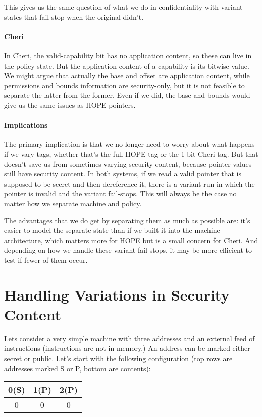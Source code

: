 \documentclass{article}
\begin{document}
This gives us the same question of what we do in confidentiality with variant states that
fail-stop when the original didn't.

\paragraph*{Cheri} In Cheri, the valid-capability bit has no application content, so these can
live in the policy state. But the application content of a capability is its bitwise value.
We might argue that actually the base and offset are application content, while permissions
and bounds information are security-only, but it is not feasible to separate the latter
from the former. Even if we did, the base and bounds would give us the same issues as HOPE
pointers.

\paragraph*{Implications} The primary implication is that we no longer need to worry about
what happens if we vary tags, whether that's the full HOPE tag or the 1-bit Cheri tag.
But that doesn't save us from sometimes varying security content, because pointer values
still have security content. In both systems, if we read a valid pointer that is supposed to
be secret and then dereference it, there is a variant run in which the pointer is invalid and
the variant fail-stops. This will always be the case no matter how we separate machine and
policy.

The advantages that we do get by separating them as much as possible are: it's easier to model
the separate state than if we built it into the machine architecture, which matters more for
HOPE but is a small concern for Cheri. And depending on how we handle these variant fail-stops,
it may be more efficient to test if fewer of them occur.

\section{Handling Variations in Security Content}

Lets consider a very simple machine with three addresses and an external feed of instructions
(instructions are not in memory.) An address can be marked either secret or public. Let's start with
the following configuration (top rows are addresses marked S or P, bottom are contents):

\begin{tabular}{| c | c | c |}
  \hline
  0(S) & 1(P) & 2(P) \\
  \hline
  0 & 0 & 0 \\
  \hline
\end{tabular}
\end{document}
